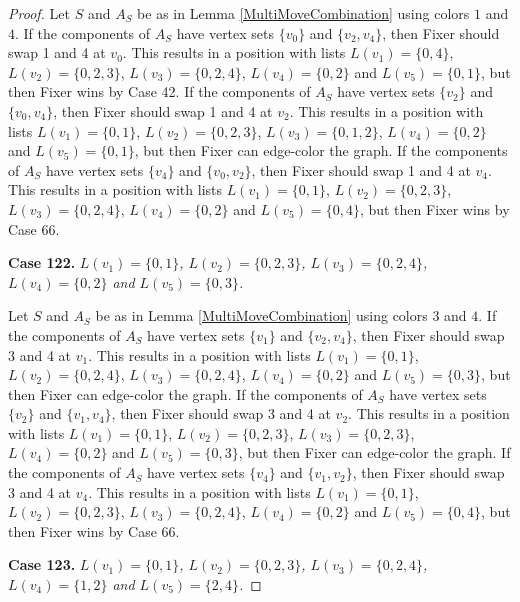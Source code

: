 \documentclass[12pt]{amsart}
\theoremstyle{plain}
\theoremstyle{definition}
\theoremstyle{remark}
\begin{document}
\begin{proof}
Let $S$ and $A_S$ be as in Lemma \ref{MultiMoveCombination} using colors $1$ and $4$. If the components of $A_S$ have vertex sets $\{v_0\}$ and $\{v_2, v_4\}$, then Fixer should swap 1 and 4 at $v_0$. This results in a position with lists $L(v_1) = \{0, 4\}$, $L(v_2) = \{0, 2, 3\}$, $L(v_3) = \{0, 2, 4\}$, $L(v_4) = \{0, 2\}$ and $L(v_5) = \{0, 1\}$, but then Fixer wins by Case 42.
If the components of $A_S$ have vertex sets $\{v_2\}$ and $\{v_0, v_4\}$, then Fixer should swap 1 and 4 at $v_2$. This results in a position with lists $L(v_1) = \{0, 1\}$, $L(v_2) = \{0, 2, 3\}$, $L(v_3) = \{0, 1, 2\}$, $L(v_4) = \{0, 2\}$ and $L(v_5) = \{0, 1\}$, but then Fixer can edge-color the graph.
If the components of $A_S$ have vertex sets $\{v_4\}$ and $\{v_0, v_2\}$, then Fixer should swap 1 and 4 at $v_4$. This results in a position with lists $L(v_1) = \{0, 1\}$, $L(v_2) = \{0, 2, 3\}$, $L(v_3) = \{0, 2, 4\}$, $L(v_4) = \{0, 2\}$ and $L(v_5) = \{0, 4\}$, but then Fixer wins by Case 66.

\noindent\textbf{Case 122.  }\textit{$L(v_1) = \{0, 1\}$, $L(v_2) = \{0, 2, 3\}$, $L(v_3) = \{0, 2, 4\}$, $L(v_4) = \{0, 2\}$ and $L(v_5) = \{0, 3\}$.}

Let $S$ and $A_S$ be as in Lemma \ref{MultiMoveCombination} using colors $3$ and $4$. If the components of $A_S$ have vertex sets $\{v_1\}$ and $\{v_2, v_4\}$, then Fixer should swap 3 and 4 at $v_1$. This results in a position with lists $L(v_1) = \{0, 1\}$, $L(v_2) = \{0, 2, 4\}$, $L(v_3) = \{0, 2, 4\}$, $L(v_4) = \{0, 2\}$ and $L(v_5) = \{0, 3\}$, but then Fixer can edge-color the graph.
If the components of $A_S$ have vertex sets $\{v_2\}$ and $\{v_1, v_4\}$, then Fixer should swap 3 and 4 at $v_2$. This results in a position with lists $L(v_1) = \{0, 1\}$, $L(v_2) = \{0, 2, 3\}$, $L(v_3) = \{0, 2, 3\}$, $L(v_4) = \{0, 2\}$ and $L(v_5) = \{0, 3\}$, but then Fixer can edge-color the graph.
If the components of $A_S$ have vertex sets $\{v_4\}$ and $\{v_1, v_2\}$, then Fixer should swap 3 and 4 at $v_4$. This results in a position with lists $L(v_1) = \{0, 1\}$, $L(v_2) = \{0, 2, 3\}$, $L(v_3) = \{0, 2, 4\}$, $L(v_4) = \{0, 2\}$ and $L(v_5) = \{0, 4\}$, but then Fixer wins by Case 66.

\noindent\textbf{Case 123.  }\textit{$L(v_1) = \{0, 1\}$, $L(v_2) = \{0, 2, 3\}$, $L(v_3) = \{0, 2, 4\}$, $L(v_4) = \{1, 2\}$ and $L(v_5) = \{2, 4\}$.}


\end{proof}
\end{document}
